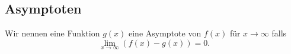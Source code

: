 \subsection{Asymptoten}
    Wir nennen eine Funktion $g(x)$ eine Asymptote von $f(x)$ für $x \to \infty$ falls
    $$
        \lim_{x \to \infty} (f(x) - g(x)) = 0.
    $$